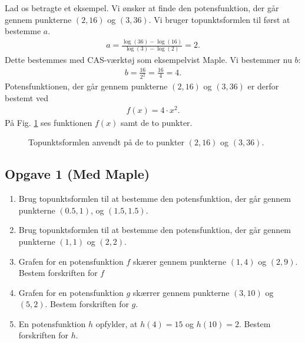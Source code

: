 \begin{exa}
Lad os betragte et eksempel. Vi ønsker at finde den potensfunktion, der går gennem punkterne $(2,16)$ og  $(3,36)$. 
Vi bruger topunktsformlen til først at bestemme $a$.
\begin{align*}
a = \frac{\log(36)-\log(16)}{\log(3)-\log(2)} = 2.
\end{align*}
Dette bestemmes med CAS-værktøj som eksempelvist Maple. 
Vi bestemmer nu $b$:
\begin{align*}
b = \frac{16}{2^2} = \frac{16}{4} = 4.
\end{align*}
Potensfunktionen, der går gennem punkterne  $(2,16)$ og  $(3,36)$ er derfor bestemt ved
\begin{align*}
f(x) = 4\cdot x^2.
\end{align*}
På Fig. \ref{fig:topunktpotens} ses funktionen $f(x)$ samt de to punkter. 
\begin{figure}[H]
\centering
{}
\caption{Topunktsformlen anvendt på de to punkter $(2,16)$ og $(3,36)$.}
\label{fig:topunktpotens}
\end{figure}
\end{exa}
\subsection*{Opgave 1 (Med Maple)}
\begin{enumerate}[label=\roman*)]

\item Brug topunktsformlen til at bestemme den potensfunktion, der går gennem punkterne $(0.5,1)$, og $(1.5,1.5)$.
\item Brug topunktsformlen til at bestemme den potensfunktion, der går gennem punkterne $(1,1)$ og $(2,2)$.

\item Grafen for en potensfunktion $f$ skærer gennem punkterne $(1,4)$ og $(2,9)$. Bestem forskriften for $f$
\item Grafen for en potensfunktion $g$ skærrer gennem punkterne $(3,10)$ og $(5,2)$. Bestem forskriften for $g$.
\item En potensfunktion $h$ opfylder, at $h(4)=15$ og $h(10) = 2$. Bestem forskriften for $h$.
\end{enumerate}

